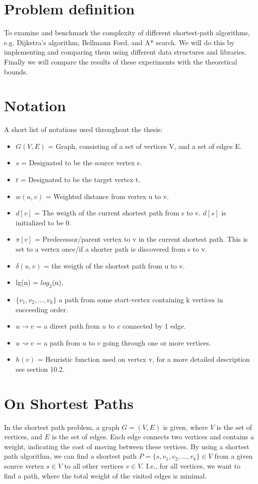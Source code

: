 \documentclass[11pt]{article}
\begin{document}
\section{Problem definition}
To examine and benchmark the complexity of different shortest-path algorithms, e.g. Dijkstra's algorithm, Bellmann Ford, and A* search. We will do this by implementing and comparing them using different data structures and libraries. Finally we will compare the results of these experiments with the theoretical bounds.

\section{Notation}
A short list of notations used throughout the thesis:
\begin{itemize}
\item $G(V,E)$ = Graph, consisting of a set of vertices V, and a set of edges E.
\item $s$ = Designated to be the source vertex s.
\item $t$ = Designated to be the target vertex t.
\item $w(u,v)$ = Weighted distance from vertex u to v.
\item $d[v]$ = The weigth of the current shortest path from s to v. $d[s]$ is initialized to be 0.
\item $\pi[v]$ = Predecessor/parent vertex to v in the current shortest path. This is set to a vertex once/if a shorter path is discovered from s to v.
\item $\delta(u,v)$ = the weigth of the shortest path from u to v.
\item lg(n) = $log_{2}$(n).
\item $\{v_{1}, v_{2}, ..., v_{k}\}$ a path from some start-vertex containing k vertices in succeeding order.
\item $u \rightarrow v$ = a direct path from $u$ to $v$ connected by 1 edge.
\item $u \rightsquigarrow v$ = a path from $u$ to $v$ going through one or more vertices.
\item $h(v)$ = Heuristic function used on vertex v, for a more detailed description see section 10.2.
\end{itemize}

\section{On Shortest Paths}
In the shortest path problem, a graph $G = (V,E)$ is given, where $V$	
is the set of vertices, and $E$ is the set of edges. Each edge
connects two vertices and contains a weight, indicating the cost of
moving between these vertices. By using a shortest path algorithm, we
can find a shortest path $P = \{s, v_{1}, v_{2}, ..., v_{k}\} \in V$ from a
given source vertex $s \in V$ to all other vertices $v \in V$. I.e., for all vertices, we want to find a path, where the total weight of the visited edges is minimal.\\
\end{document}
